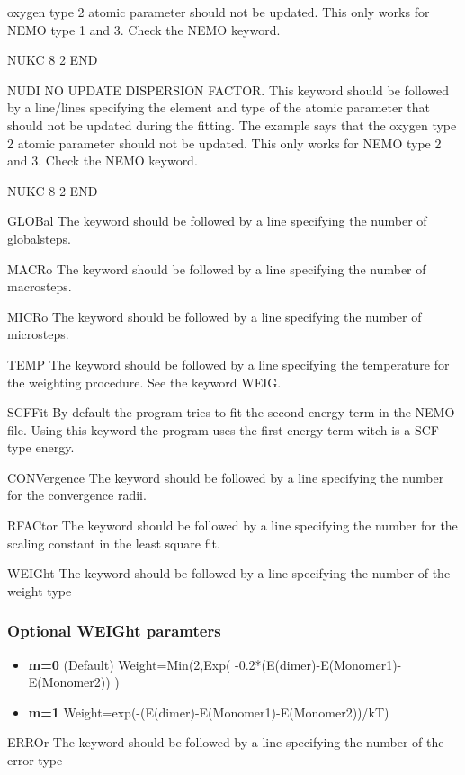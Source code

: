 \begin{keywordlist}
oxygen type 2 atomic parameter should not be updated. This only works for NEMO type 1 and 3. Check the NEMO keyword.
\begin{inputlisting}
NUKC
8 2
END
\end{inputlisting}
\item[NUDI]
NO UPDATE DISPERSION FACTOR. This keyword should be followed by a line/lines specifying the element and type
of the atomic parameter that should not be updated during the fitting. The example says that the
oxygen type 2 atomic parameter should not be updated. This only works for NEMO type 2 and 3. Check the NEMO keyword.
\begin{inputlisting}
NUKC
8 2
END
\end{inputlisting}
\item[GLOBal]
The keyword should be followed by a line specifying the number of globalsteps.
\item[MACRo]
The keyword should be followed by a line specifying the number of macrosteps.
\item[MICRo]
The keyword should be followed by a line specifying the number of microsteps.
\item[TEMP]
The keyword should be followed by a line specifying the temperature for the weighting procedure. See the keyword WEIG.
\item[SCFFit]
By default the program tries to fit the second energy term in the NEMO file. Using this keyword the program uses the
first energy term witch is a SCF type energy.
\item[CONVergence]
The keyword should be followed by a line specifying the number for the convergence radii.
\item[RFACtor]
The keyword should be followed by a line specifying the number for the scaling constant in the least square fit.
\item[WEIGht]
The keyword should be followed by a line specifying the number of the weight type
\subsubsection{Optional WEIGht paramters}
\begin{itemize}
\itemsep 9pt plus 3pt minus 3pt
\item
{\bf m=0}
(Default) Weight=Min(2,Exp( -0.2*(E(dimer)-E(Monomer1)-E(Monomer2)) )
\item
{\bf m=1}
Weight=exp(-(E(dimer)-E(Monomer1)-E(Monomer2))/kT)
\end{itemize}
\item[ERROr]
The keyword should be followed by a line specifying the number of the error type

\end{keywordlist}
